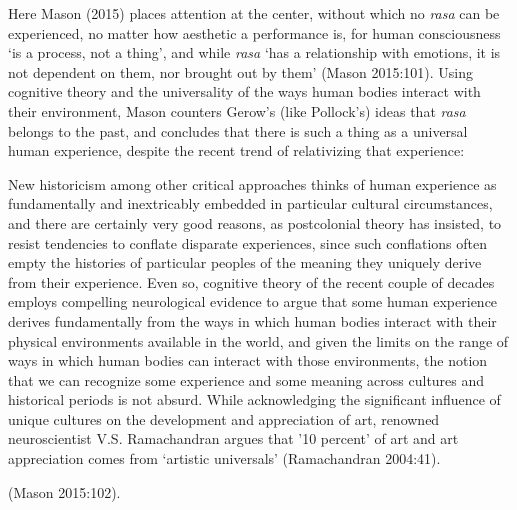 Here Mason (2015) places attention at the center, without which no \textsl{rasa} can be experienced, no matter how aesthetic a performance is, for human consciousness ‘is a process, not a thing’, and while \textsl{rasa} ‘has a relationship with emotions, it is not dependent on them, nor brought out by them’ (Mason 2015:101). Using cognitive theory and the universality of the ways human bodies interact with their environment, Mason counters Gerow’s (like Pollock’s) ideas that \textsl{rasa} belongs to the past, and concludes that there is such a thing as a universal human experience, despite the recent trend of relativizing that experience:

\begin{myquote}
New historicism among other critical approaches thinks of human experience as fundamentally and inextricably embedded in particular cultural circumstances, and there are certainly very good reasons, as postcolonial theory has insisted, to resist tendencies to conflate disparate experiences, since such conflations often empty the histories of particular peoples of the meaning they uniquely derive from their experience. Even so, cognitive theory of the recent couple of decades employs compelling neurological evidence to argue that some human experience derives fundamentally from the ways in which human bodies interact with their physical environments available in the world, and given the limits on the range of ways in which human bodies can interact with those environments, the notion that we can recognize some experience and some meaning across cultures and historical periods is not absurd. While acknowledging the significant influence of unique cultures on the development and appreciation of art, renowned neuroscientist V.S. Ramachandran argues that ’10 percent’ of art and art appreciation comes from ‘artistic universals’ (Ramachandran 2004:41).  

\hfill(Mason 2015:102). 
\end{myquote}

